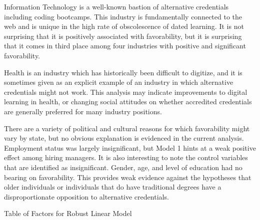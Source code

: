 \documentclass[review]{elsarticle}
\begin{document}
Information Technology is a well-known bastion of alternative credentials including coding bootcamps.
This industry is fundamentally connected to the web and is unique in the high rate of obscolescence of dated learning.
It is not surprising that it is positively associated with favorability,
but it is surprising that it comes in third place among four industries with positive and significant favorability.

Health is an industry which has historically been difficult to digitize,
and it is sometimes given as an explicit example of an industry in which alternative credentials
might not work. %
This analysis may indicate improvements to digital learning in health,
or changing social attitudes on whether accredited credentials are
generally preferred for many industry positions.

There are a variety of political and cultural reasons for which favorability might vary by state,
but no obvious explanation is evidenced in the current analysis.
Employment status was largely insignificant,
but Model 1 hints at a weak positive effect among hiring managers.
It is also interesting to note the control variables that are identified as insignificant.
Gender, age, and level of education had no bearing on favorability.
This provides weak evidence against the hypotheses that older individuals
or individuals that do have traditional degrees have a disproportionate opposition to alternative credentials.





\begin{table}
    \caption{Table of Factors for Robust Linear Model}
    \resizebox{\columnwidth}{!}{
        
    }
    \label{tab:table_robust_reg}
\end{table}
\end{document}
